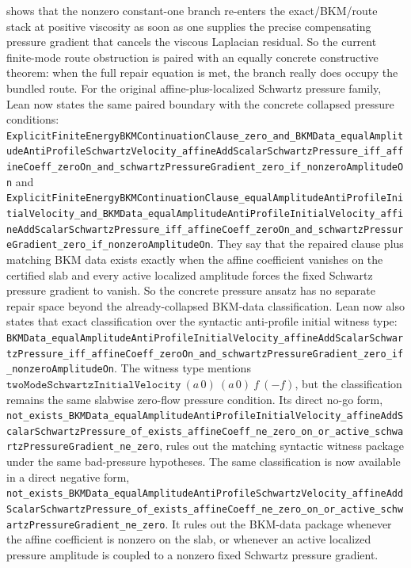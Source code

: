 \documentclass[11pt]{article}
\theoremstyle{remark}
\begin{document}
shows that the nonzero constant-one branch re-enters the exact/BKM/route stack
at positive viscosity as soon as one supplies the precise compensating pressure
gradient that cancels the viscous Laplacian residual.  So the current
finite-mode route obstruction is paired with an equally concrete constructive
theorem: when the full repair equation is met, the branch really does occupy
the bundled route.
For the original affine-plus-localized Schwartz pressure family, Lean now
states the same paired boundary with the concrete collapsed pressure
conditions:
\texttt{ExplicitFiniteEnergyBKMContinuationClause\_zero\_and\_BKMData\_equalAmplitudeAntiProfileSchwartzVelocity\_affineAddScalarSchwartzPressure\_iff\_affineCoeff\_zeroOn\_and\_schwartzPressureGradient\_zero\_if\_nonzeroAmplitudeOn}
and
\texttt{ExplicitFiniteEnergyBKMContinuationClause\_equalAmplitudeAntiProfileInitialVelocity\_and\_BKMData\_equalAmplitudeAntiProfileInitialVelocity\_affineAddScalarSchwartzPressure\_iff\_affineCoeff\_zeroOn\_and\_schwartzPressureGradient\_zero\_if\_nonzeroAmplitudeOn}.
They say that the repaired clause plus matching BKM data exists exactly when
the affine coefficient vanishes on the certified slab and every active
localized amplitude forces the fixed Schwartz pressure gradient to vanish.
So the concrete pressure ansatz has no separate repair space beyond the
already-collapsed BKM-data classification.
Lean now also states that exact classification over the syntactic
anti-profile initial witness type:
\texttt{BKMData\_equalAmplitudeAntiProfileInitialVelocity\_affineAddScalarSchwartzPressure\_iff\_affineCoeff\_zeroOn\_and\_schwartzPressureGradient\_zero\_if\_nonzeroAmplitudeOn}.
The witness type mentions
\(\texttt{twoModeSchwartzInitialVelocity}\ (a\,0)\ (a\,0)\ f\ (-f)\), but the
classification remains the same slabwise zero-flow pressure condition.  Its
direct no-go form,
\texttt{not\_exists\_BKMData\_equalAmplitudeAntiProfileInitialVelocity\_affineAddScalarSchwartzPressure\_of\_exists\_affineCoeff\_ne\_zero\_on\_or\_active\_schwartzPressureGradient\_ne\_zero},
rules out the matching syntactic witness package under the same bad-pressure
hypotheses.
The same classification is now available in a direct negative form,
\texttt{not\_exists\_BKMData\_equalAmplitudeAntiProfileSchwartzVelocity\_affineAddScalarSchwartzPressure\_of\_exists\_affineCoeff\_ne\_zero\_on\_or\_active\_schwartzPressureGradient\_ne\_zero}.
It rules out the BKM-data package whenever the affine coefficient is nonzero on
the slab, or whenever an active localized pressure amplitude is coupled to a
nonzero fixed Schwartz pressure gradient.
\end{document}
